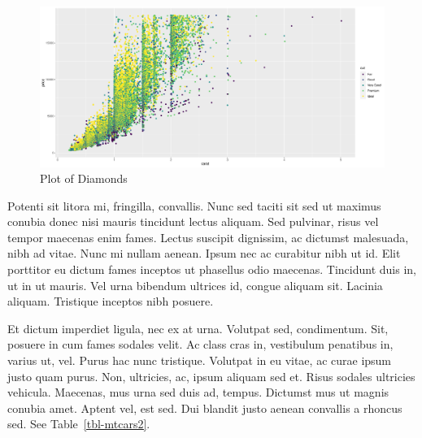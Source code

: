 \documentclass[
  9pt,
  letterpaper,
  DIV=11,
  numbers=noendperiod]{scrartcl}
\begin{document}
\begin{figure}[t]

\includegraphics[width=1\textwidth,height=\textheight]{man_files/figure-pdf/fig-diamonds2-1.pdf} \hfill{}

\caption{\label{fig-diamonds2}Plot of Diamonds}

\end{figure}

Potenti sit litora mi, fringilla, convallis. Nunc sed taciti sit sed ut
maximus conubia donec nisi mauris tincidunt lectus aliquam. Sed
pulvinar, risus vel tempor maecenas enim fames. Lectus suscipit
dignissim, ac dictumst malesuada, nibh ad vitae. Nunc mi nullam aenean.
Ipsum nec ac curabitur nibh ut id. Elit porttitor eu dictum fames
inceptos ut phasellus odio maecenas. Tincidunt duis in, ut in ut mauris.
Vel urna bibendum ultrices id, congue aliquam sit. Lacinia aliquam.
Tristique inceptos nibh posuere.

Et dictum imperdiet ligula, nec ex at urna. Volutpat sed, condimentum.
Sit, posuere in cum fames sodales velit. Ac class cras in, vestibulum
penatibus in, varius ut, vel. Purus hac nunc tristique. Volutpat in eu
vitae, ac curae ipsum justo quam purus. Non, ultricies, ac, ipsum
aliquam sed et. Risus sodales ultricies vehicula. Maecenas, mus urna sed
duis ad, tempus. Dictumst mus ut magnis conubia amet. Aptent vel, est
sed. Dui blandit justo aenean convallis a rhoncus sed. See
Table~\ref{tbl-mtcars2}.
\end{document}
